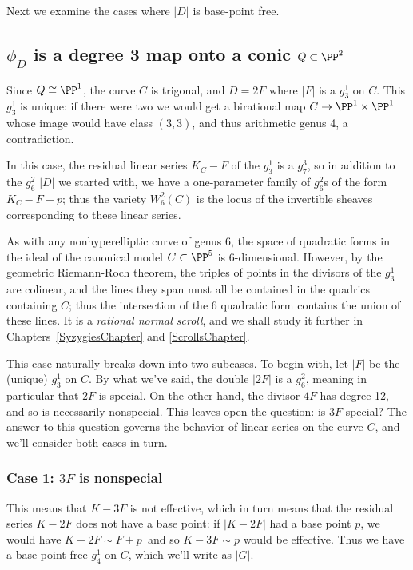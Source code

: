 Next we examine the cases where $|D|$ is base-point free.

\subsection{$\phi_{D}$ is a degree 3 map onto a conic $Q \subset \PP^{2}$}

Since $Q  \cong \PP^1$, the curve $C$ is trigonal, and  $D = 2F$ where $|F|$ is a $g^{1}_{3}$ on $C$. This $g^1_3$ is unique: if there were two we would get a birational map $C \to \PP^1\times \PP^1$ whose image would have class $(3,3)$, and thus
arithmetic genus 4, a contradiction.

In this case, the residual linear series $K_C - F$ of the $g^1_3$ is a $g^3_7$, so in addition to the $g^2_6$ $|D|$ we started with, we have a one-parameter family of $g^2_6$s of the form  $K_C - F - p$; thus the variety $W^2_6(C)$ is the locus of the invertible sheaves corresponding to these linear series.

As with any nonhyperelliptic curve of genus 6, the space of quadratic forms in the ideal of the canonical model $C \subset \PP^5$ is 6-dimensional. However, by the geometric Riemann-Roch theorem, the triples of points in the divisors of the $g^1_3$ are colinear,
and the lines they span must all be contained in the quadrics containing $C$; thus the intersection of the 6 quadratic
form contains the union of these lines. It is a \emph{rational normal scroll},
and we shall study it further in Chapters~\ref{SyzygiesChapter} and \ref{ScrollsChapter}.

This case naturally breaks down into two subcases. To begin with, let $|F|$ be the (unique) $g^1_3$ on $C$. By what we've said, the double $|2F|$ is a $g^2_6$, meaning in particular that $2F$ is special. On the other hand, the divisor $4F$ has degree 12, and so is necessarily nonspecial. This leaves open the question: is $3F$ special? The answer to this question governs the behavior of linear series on the curve $C$, and we'll consider both cases in turn.

\subsubsection{Case 1: $3F$ is nonspecial} This means that $K-3F$ is not effective, which in turn means that the residual series $K-2F$ does not have a base point: if $|K-2F|$ had a base point $p$, we would have $K - 2F \sim F + p$\, and so $K-3F \sim p$ would be effective. Thus we have a base-point-free $g^1_4$ on $C$, which we'll write as $|G|$.

